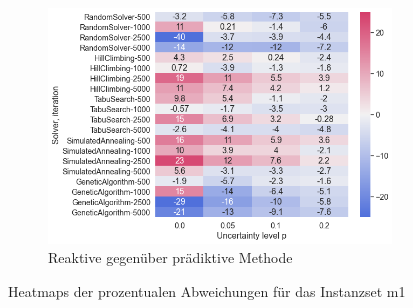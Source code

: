 \begin{figure}[H]
\begin{subfigure}{1\linewidth}
        \centering
        \includegraphics[width=0.5\linewidth]{assets/img/05_Evaluation/heatmap_m1_3.png}
        \caption{Reaktive gegenüber prädiktive Methode}
        \label{fig:evaluation_solver_m1_heatmap_3}
    \end{subfigure}
    
    \caption{Heatmaps der prozentualen Abweichungen für das Instanzset m1}
    \label{fig:evaluation_m1_heatmaps}
\end{figure}


